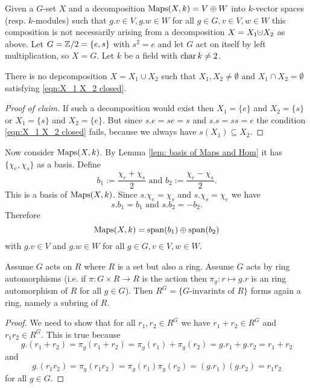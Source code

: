 \begin{expl}
 Given a $G$-set $X$ and a decomposition $\operatorname{Maps}(X,k) = V \oplus W$ into $k$-vector spaces (resp. $k$-modules) such that $g.v \in V, g.w \in W$ for all $g \in G, v \in V, w \in W$ this composition is not necessarily arising from a decomposition $X = X_1 \dotcup X_2$ as above.
 Let $G = \mathbb{Z}/2 = \{e,s\}$ with $s^2 = e$ and let $G$ act on itself by left multiplication, so $X = G$. Let $k$ be a field with $\operatorname{char} k \neq 2$.
 \begin{claim}
  There is no depcomposition $X = X_1 \cup X_2$ such that $X_1, X_2 \neq \emptyset$ and $X_1 \cap X_2 = \emptyset$ satisfying \eqref{eqn:X_1 X_2 closed}.
 \end{claim}
 \begin{proof}[Proof of claim]
  If such a decomposition would exist then $X_1 = \{e\}$ and $X_2 = \{s\}$ or $X_1 = \{s\}$ and $X_2 = \{e\}$. But since $s.e = se = s$ and $s.s = ss = e$ the condition \eqref{eqn:X_1 X_2 closed} fails, because we always have $s(X_1) \subseteq X_2$.
 \end{proof}
 Now consider $\operatorname{Maps}(X,k)$. By Lemma \ref{lem: basis of Maps and Hom} it has $\{\chi_e,\chi_s\}$ as a basis. Define
 \[
  b_1 := \frac{\chi_e + \chi_s}{2} \text{ and } b_2 := \frac{\chi_e - \chi_s}{2}.
 \]
 This is a basis of $\operatorname{Maps}(X,k)$. Since $s.\chi_e = \chi_s$ and $s.\chi_s = \chi_e$ we have
 \[
  s.b_1 = b_1 \text{ and } s.b_2 = -b_2.
 \]
 Therefore
 \[
  \operatorname{Maps}(X,k) = \operatorname{span}(b_1) \oplus \operatorname{span}(b_2)
 \]
 with $g.v \in V$ and $g.w \in W$ for all $g \in G, v \in V, w \in W$.
\end{expl}


\begin{lem}\label{lem: group action by ring automorphisms}
 Assume $G$ acts on $R$ where $R$ is a set but also a ring. Assume $G$ acts by ring automorphisms (i.e. if $\pi : G \times R \to R$ is the action then $\pi_g : r \mapsto g.r$ is an ring automorphism of $R$ for all $g \in G$). Then $R^G = \{\text{$G$-invarints of $R$}\}$ forms again a ring, namely a subring of $R$.
\end{lem}
\begin{proof}
 We need to show that for all $r_1, r_2 \in R^G$ we have $r_1 + r_2 \in R^G$ and $r_1 r_2 \in R^G$. This is true because
 \[
  g.(r_1 + r_2) = \pi_g(r_1 + r_2) = \pi_g(r_1) + \pi_g(r_2) = g.r_1 + g.r_2 = r_1 + r_2
 \]
 and
 \[
  g.(r_1 r_2) = \pi_g(r_1 r_2) = \pi_g(r_1) \pi_g(r_2) = (g.r_1)(g.r_2) = r_1 r_2
 \]
 for all $g \in G$.
\end{proof}


